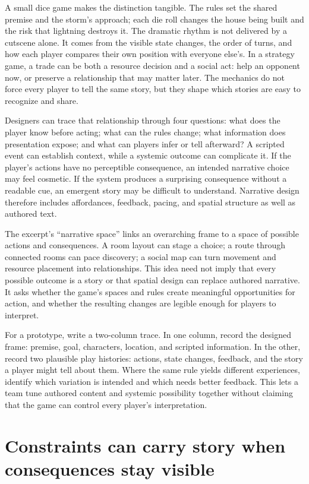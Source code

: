 A small dice game makes the distinction tangible. The rules set the shared premise and the storm's approach; each die roll changes the house being built and the risk that lightning destroys it. The dramatic rhythm is not delivered by a cutscene alone. It comes from the visible state changes, the order of turns, and how each player compares their own position with everyone else's. In a strategy game, a trade can be both a resource decision and a social act: help an opponent now, or preserve a relationship that may matter later. The mechanics do not force every player to tell the same story, but they shape which stories are easy to recognize and share.

Designers can trace that relationship through four questions: what does the player know before acting; what can the rules change; what information does presentation expose; and what can players infer or tell afterward? A scripted event can establish context, while a systemic outcome can complicate it. If the player's actions have no perceptible consequence, an intended narrative choice may feel cosmetic. If the system produces a surprising consequence without a readable cue, an emergent story may be difficult to understand. Narrative design therefore includes affordances, feedback, pacing, and spatial structure as well as authored text.

The excerpt's ``narrative space'' links an overarching frame to a space of possible actions and consequences. A room layout can stage a choice; a route through connected rooms can pace discovery; a social map can turn movement and resource placement into relationships. This idea need not imply that every possible outcome is a story or that spatial design can replace authored narrative. It asks whether the game's spaces and rules create meaningful opportunities for action, and whether the resulting changes are legible enough for players to interpret.

For a prototype, write a two-column trace. In one column, record the designed frame: premise, goal, characters, location, and scripted information. In the other, record two plausible play histories: actions, state changes, feedback, and the story a player might tell about them. Where the same rule yields different experiences, identify which variation is intended and which needs better feedback. This lets a team tune authored content and systemic possibility together without claiming that the game can control every player's interpretation.

\section{Constraints can carry story when consequences stay visible}\label{06-engine-ii-ch047-constraints-can-carry-story-when-consequences-stay-visible}

